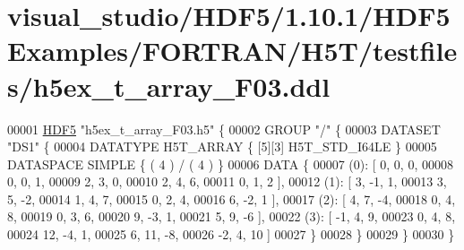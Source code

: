 \hypertarget{visual__studio_2_h_d_f5_21_810_81_2_h_d_f5_examples_2_f_o_r_t_r_a_n_2_h5_t_2testfiles_2h5ex__t__array___f03_8ddl_source}{}\section{visual\+\_\+studio/\+H\+D\+F5/1.10.1/\+H\+D\+F5\+Examples/\+F\+O\+R\+T\+R\+A\+N/\+H5\+T/testfiles/h5ex\+\_\+t\+\_\+array\+\_\+\+F03.ddl}
\label{visual__studio_2_h_d_f5_21_810_81_2_h_d_f5_examples_2_f_o_r_t_r_a_n_2_h5_t_2testfiles_2h5ex__t__array___f03_8ddl_source}

\begin{DoxyCode}
00001 \hyperlink{namespace_h_d_f5}{HDF5} \textcolor{stringliteral}{"h5ex\_t\_array\_F03.h5"} \{
00002 GROUP \textcolor{stringliteral}{"/"} \{
00003    DATASET \textcolor{stringliteral}{"DS1"} \{
00004       DATATYPE  H5T\_ARRAY \{ [5][3] H5T\_STD\_I64LE \}
00005       DATASPACE  SIMPLE \{ ( 4 ) / ( 4 ) \}
00006       DATA \{
00007       (0): [ 0, 0, 0,
00008             0, 0, 1,
00009             2, 3, 0,
00010             2, 4, 6,
00011             0, 1, 2 ],
00012       (1): [ 3, -1, 1,
00013             3, 5, -2,
00014             1, 4, 7,
00015             0, 2, 4,
00016             6, -2, 1 ],
00017       (2): [ 4, 7, -4,
00018             0, 4, 8,
00019             0, 3, 6,
00020             9, -3, 1,
00021             5, 9, -6 ],
00022       (3): [ -1, 4, 9,
00023             0, 4, 8,
00024             12, -4, 1,
00025             6, 11, -8,
00026             -2, 4, 10 ]
00027       \}
00028    \}
00029 \}
00030 \}
\end{DoxyCode}
